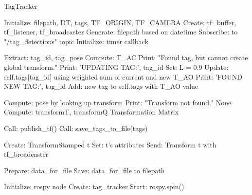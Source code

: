 \documentclass{article}
\begin{document}
\begin{algorithm}
\caption{TagTracker}
\begin{algorithmic}[1]
\State Initialize: filepath, DT, tags, TF\_ORIGIN, TF\_CAMERA
\State Create: tf\_buffer, tf\_listener, tf\_broadcaster
\State Generate: filepath based on datetime
\State Subscribe: to "/tag\_detections" topic
\State Initialize: timer callback

        \State \Return
    \EndIf
        \State Extract: tag\_id, tag\_pose
        \State Compute: T\_AC
            \State Print: "Found tag, but cannot create global transform."
            \State \Return
            \State Print: 'UPDATING TAG:', tag\_id
            \State Set: L = 0.9
            \State Update: self.tags[tag\_id] using weighted sum of current and new T\_AO
        \Else
            \State Print: 'FOUND NEW TAG:', tag\_id
            \State Add: new tag to self.tags with T\_AO value
        \EndIf
    \EndFor
\EndFunction

    \Try
        \State Compute: pose by looking up transform
    \Except
        \State Print: "Transform not found."
        \State \Return None
    \EndTry
    \State Compute: transformT, transformQ
    \State \Return Transformation Matrix
\EndFunction

    \State Call: publish\_tf()
    \State Call: save\_tags\_to\_file(tags)
\EndFunction

        \State Create: TransformStamped t
        \State Set: t's attributes
        \State Send: Transform t with tf\_broadcaster
    \EndFor
\EndFunction

        \State \Return
    \EndIf
    \State Prepare: data\_for\_file
    \State Save: data\_for\_file to filepath
\EndFunction

    \State Initialize: rospy node
    \State Create: tag\_tracker
    \State Start: rospy.spin()
\EndFunction

\end{algorithmic}
\end{algorithm}
\end{document}
